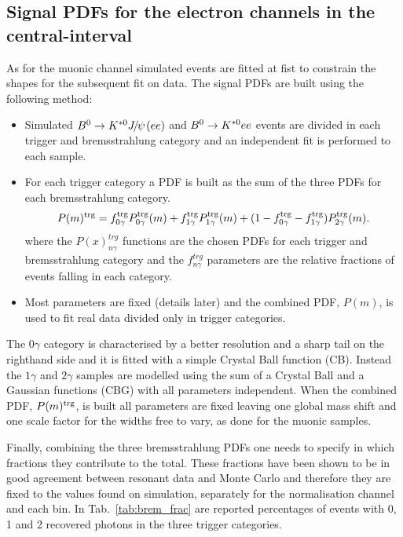 \subsection{Signal PDFs for the electron channels in the central-\qsq interval}
\label{sec:fit_ee_central}

As for the muonic channel simulated events are fitted at fist to constrain
the shapes for the subsequent fit on data. The signal PDFs are built using the following method:
%
\begin{itemize}
\item Simulated $\Bz\to\Kstarz\jpsi(ee)$ and ${{B}^0}\rightarrow{\ensuremath{{K}^{*0}}} ee$ events are divided
in each trigger and bremsstrahlung category and an independent fit is performed to each sample.
\item For each trigger category a PDF is built as the sum of the three PDFs for each bremsstrahlung category.
\begin{equation}
P(m)^{\rm trg} = f^{\rm trg}_{0\gamma} P^{\rm trg}_{0\gamma}(m) + f^{\rm trg}_{1\gamma} P^{\rm trg}_{1\gamma}(m) + (1 - f^{\rm trg}_{0\gamma} - f^{\rm trg}_{1\gamma}) P^{\rm trg}_{2\gamma}(m).
\end{equation}
where the $P(x)^{trg}_{n\gamma}$ functions are the chosen PDFs for each trigger and bremsstrahlung category
and the $f^{trg}_{n\gamma}$ parameters are the relative fractions of events falling in each category.
\item Most parameters are fixed (details later) and the combined PDF, $P(m)$,
is used to fit real data divided only in trigger categories.
\end{itemize}

The $0\gamma$ category is characterised by a better resolution and a sharp tail on the righthand
side and it is fitted with a simple Crystal Ball function (CB). Instead the $1\gamma$ and $2\gamma$
samples are modelled using the sum of a Crystal Ball and a Gaussian functions (CBG) with all parameters independent.
When the combined PDF, $P(m)^{\rm trg}$, is built all parameters are fixed leaving one global mass shift 
and one scale factor for the widths free to vary, as done for the muonic samples.

Finally, combining the three bremsstrahlung PDFs one needs to specify in which fractions they
contribute to the total. These fractions have been shown to be in good agreement between 
resonant data and Monte Carlo
and therefore they are fixed to the values found on simulation, separately for the normalisation
channel and each \qsq bin. In Tab.~\ref{tab:brem_frac} are reported percentages of events
with 0, 1 and 2 recovered photons in the three trigger categories.

